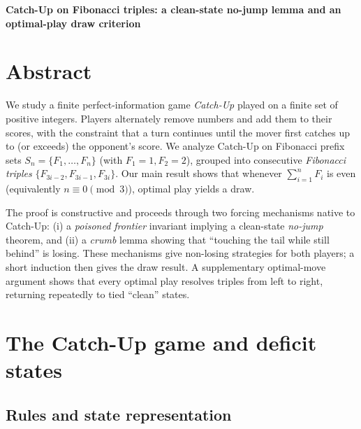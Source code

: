 \documentclass[11pt]{article}
\begin{document}
\begin{center}
{\Large \textbf{Catch-Up on Fibonacci triples: a clean-state no-jump lemma and an optimal-play draw criterion}}\\
\end{center}

\section*{Abstract}
We study a finite perfect-information game \emph{Catch-Up} played on a finite set of positive integers.
Players alternately remove numbers and add them to their scores, with the constraint that a turn continues
until the mover first catches up to (or exceeds) the opponent's score. We analyze Catch-Up on Fibonacci
prefix sets $S_n=\{F_1,\dots,F_n\}$ (with $F_1=1,F_2=2$), grouped into consecutive \emph{Fibonacci triples}
$\{F_{3i-2},F_{3i-1},F_{3i}\}$. Our main result shows that whenever $\sum_{i=1}^n F_i$ is even
(equivalently $n\equiv 0\pmod 3$), optimal play yields a draw.

The proof is constructive and proceeds through two forcing mechanisms native to Catch-Up:
(i) a \emph{poisoned frontier} invariant implying a clean-state \emph{no-jump} theorem, and
(ii) a \emph{crumb} lemma showing that ``touching the tail while still behind'' is losing.
These mechanisms give non-losing strategies for both players; a short induction then gives the draw result.
A supplementary optimal-move argument shows that every optimal play resolves triples from left to right,
returning repeatedly to tied ``clean'' states.


\section{The Catch-Up game and deficit states}

\subsection{Rules and state representation}
\end{document}
